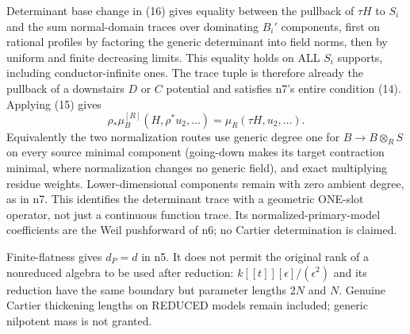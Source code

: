 Determinant base change in (16) gives equality between the pullback of $\tau H$ to $S_i$ and the sum normal-domain traces over dominating $B_i'$ components, first on rational profiles by factoring the generic determinant into field norms, then by uniform and finite decreasing limits. This equality holds on ALL $S_i$ supports, including conductor-infinite ones. The trace tuple is therefore already the pullback of a downstairs $D$ or $C$ potential and satisfies n7's entire condition (14). Applying (15) gives
\[
 \rho_*\mu_B^{[R]}(H,\rho^*u_2,\ldots)=\mu_R(\tau H,u_2,\ldots). \tag{20}
\]
Equivalently the two normalization routes use generic degree one for $B\to B\otimes_RS$ on every source minimal component (going-down makes its target contraction minimal, where normalization changes no generic field), and exact multiplying residue weights. Lower-dimensional components remain with zero ambient degree, as in n7. This identifies the determinant trace with a geometric ONE-slot operator, not just a continuous function trace. Its normalized-primary-model coefficients are the Weil pushforward of n6; no Cartier determination is claimed.

Finite-flatness gives $d_P=d$ in n5. It does not permit the original rank of a nonreduced algebra to be used after reduction: $k[[t]][\epsilon]/(\epsilon^2)$ and its reduction have the same boundary but parameter lengths $2N$ and $N$. Genuine Cartier thickening lengths on REDUCED models remain included; generic nilpotent mass is not granted.
